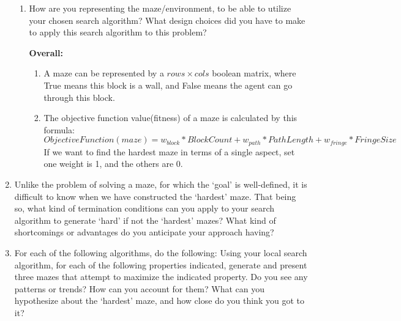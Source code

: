 \documentclass[letter]{article}
\begin{document}
\begin{enumerate}[resume]
\begin{enumerate}
			\item {How are you representing the maze/environment, to be able to utilize your chosen search algorithm? What design choices did you have to make to apply this search algorithm to this problem?} 
			
			\textbf{Overall:}
			\begin{enumerate}
				\item {A maze can be represented by a $ rows \times cols $ boolean matrix, where True means this block is a wall, and False means the agent can go through this block.} \\
				\item {The objective function value(fitness) of a maze is calculated by this formula: $$ObjectiveFunction(maze) = w_{block}*BlockCount+w_{path}*PathLength+w_{fringe}*FringeSize$$ If we want to find the hardest maze in terms of a single aspect, set one weight is 1, and the others are 0.} \\
			\end{enumerate}
		\end{enumerate}
		
		\item {Unlike the problem of solving a maze, for which the ‘goal’ is well-defined, it is difficult to know when we have constructed the ‘hardest’ maze. That being so, what kind of termination conditions can you apply to your search algorithm to generate ‘hard’ if not the ‘hardest’ mazes? What kind of shortcomings or advantages do you anticipate your approach having?}
		
		\item {For each of the following algorithms, do the following: Using your local search algorithm, for each of the following properties indicated, generate and present three mazes that attempt to maximize the indicated property. Do you see any patterns or trends? How can you account for them? What can you hypothesize about the ‘hardest’ maze, and how close do you think you got to it?}
	\end{enumerate}
\end{document}
